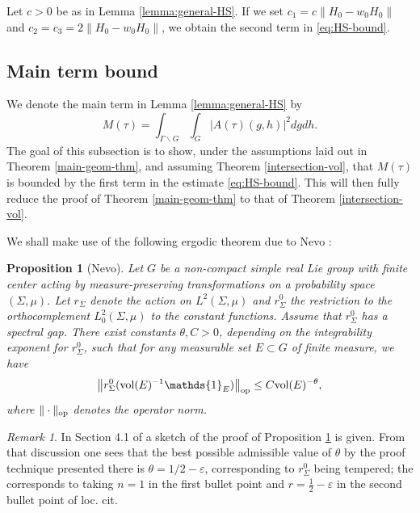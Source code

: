 \documentclass[12pt]{amsart}
\newtheorem{proposition}[theorem]{Proposition}
\theoremstyle{remark}
\newtheorem{remark}[theorem]{Remark}
\begin{document}
Let $c>0$ be as in Lemma \ref{lemma:general-HS}. If we set $c_1=c\|H_0-w_0 H_0\|$ and $c_2=c_3=2\|H_0-w_0 H_0\|$, we obtain the second term in \eqref{eq:HS-bound}.

\subsection{Main term bound}\label{sec:MTbound}
We denote the main term in Lemma \ref{lemma:general-HS} by
\begin{equation}\label{eq:main-term}
M(\tau)=\int_{\Gamma\backslash G}\int_G| A(\tau)(g,h)|^2dg dh.
\end{equation}
The goal of this subsection is to show, under the assumptions laid out in Theorem \ref{main-geom-thm}, and assuming Theorem \ref{intersection-vol}, that $M(\tau)$ is bounded by the first term in the estimate \eqref{eq:HS-bound}. This will then fully reduce the proof of Theorem \ref{main-geom-thm} to that of Theorem \ref{intersection-vol}.

We shall make use of the following ergodic theorem due to Nevo \cite{Nevo}:
\begin{proposition}[Nevo] \label{prop_nevo}
Let $G$ be a non-compact simple real Lie group with finite center acting by measure-preserving transformations on a probability space $(\Sigma,\mu)$. Let $r_\Sigma$ denote the action on $L^2(\Sigma,\mu)$ and $r^0_\Sigma$ the restriction to the orthocomplement $L^2_0(\Sigma,\mu)$ to the constant functions.  Assume that $r_\Sigma^0$ has a spectral gap. There exist constants $\theta, C > 0$, depending on the integrability exponent for $r_\Sigma^0$, such that for any measurable set $E \subset G$ of finite measure, we have
    \begin{gather*}
        \big\| r_\Sigma^0({\rm vol}(E)^{-1}\mathds{1}_E)\big\|_{\textnormal{op}} \leq C \textnormal{vol}(E)^{-\theta},
    \end{gather*}
    where $\|\cdot \|_{\textnormal{op}}$ denotes the operator norm.
\end{proposition}
\begin{remark} \label{rmk_best_theta}
    In Section 4.1 of \cite{Gorodnik_Nevo} a sketch of the proof of Proposition \ref{prop_nevo} is given. From that discussion one sees that the best possible admissible value of $\theta$ by the proof technique presented there is $\theta = 1/2 - \varepsilon$, corresponding to $r_\Sigma^0$ being tempered; the corresponds to taking $n = 1$ in the first bullet point and $r = \frac{1}{2} - \varepsilon$ in the second bullet point of loc. cit.
\end{remark}
\end{document}
